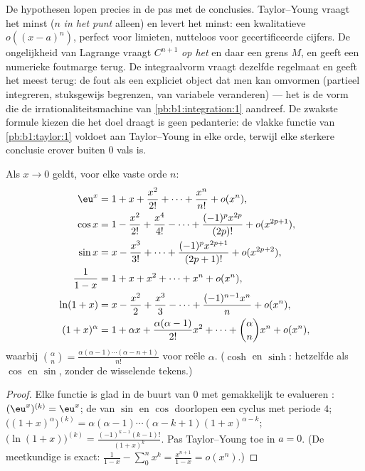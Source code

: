 \begin{remark}
De hypothesen lopen precies in de pas met de conclusies.
Taylor--Young vraagt het minst ($n$  \emph{in het punt}
alleen) en levert het minst: een kwalitatieve $o((x-a)^n)$,
perfect voor limieten, nutteloos voor gecertificeerde cijfers. De
ongelijkheid van Lagrange vraagt $C^{n+1}$ \emph{op het }
en daar een grens $M$, en geeft een numerieke foutmarge terug. De
integraalvorm vraagt dezelfde regelmaat en geeft het meest terug:
de fout als een expliciet object dat men kan omvormen (partieel
integreren, stuksgewijs begrenzen, van variabele veranderen) ---
het is de vorm die de irrationaliteitsmachine van
\cref{pb:b1:integration:1} aandreef. De zwakste formule kiezen
die het doel draagt is geen pedanterie: de vlakke functie van
\cref{pb:b1:taylor:1} voldoet aan Taylor--Young in elke orde,
terwijl elke sterkere conclusie erover buiten $0$ vals is.
\end{remark}

\begin{proposition}[Standaardontwikkelingen in $0$]
Als $x \to 0$ geldt, voor elke vaste orde $n$:
\begin{align*}
\eu^x &= 1 + x + \frac{x^2}{2!} + \dots + \frac{x^n}{n!} + o(x^n),\\
\cos x &= 1 - \frac{x^2}{2!} + \frac{x^4}{4!} - \dots
+ \frac{(-1)^p x^{2p}}{(2p)!} + o(x^{2p+1}),\\
\sin x &= x - \frac{x^3}{3!} + \dots + \frac{(-1)^p
x^{2p+1}}{(2p+1)!} + o(x^{2p+2}),\\
\frac{1}{1 - x} &= 1 + x + x^2 + \dots + x^n + o(x^n),\\
\ln(1 + x) &= x - \frac{x^2}{2} + \frac{x^3}{3} - \dots +
\frac{(-1)^{n-1} x^n}{n} + o(x^n),\\
(1 + x)^\alpha &= 1 + \alpha x + \frac{\alpha(\alpha-1)}{2!}x^2 +
\dots + \binom{\alpha}{n} x^n + o(x^n),
\end{align*}
waarbij $\binom{\alpha}{n} = \frac{\alpha(\alpha - 1)\cdots(\alpha -
n + 1)}{n!}$ voor reële $\alpha$. ($\cosh$ en $\sinh$: hetzelfde als
$\cos$ en $\sin$, zonder de wisselende tekens.)
\label{prop:b1:taylor:standard}
\end{proposition}

\begin{proof}
Elke functie is glad in de buurt van $0$ met gemakkelijk te
evalueren : $(\eu^x)^{(k)} = \eu^x$; de  van
$\sin$ en $\cos$ doorlopen een cyclus met periode $4$;
$\bigl((1+x)^\alpha\bigr)^{(k)} = \alpha(\alpha - 1)\cdots(\alpha -
k + 1)(1+x)^{\alpha - k}$; $\bigl(\ln(1+x)\bigr)^{(k)} =
\frac{(-1)^{k-1}(k-1)!}{(1+x)^k}$. Pas Taylor--Young toe in $a = 0$.
(De meetkundige is exact: $\frac{1}{1-x} - \sum_0^n x^k =
\frac{x^{n+1}}{1 - x} = o(x^n)$.)
\end{proof}

